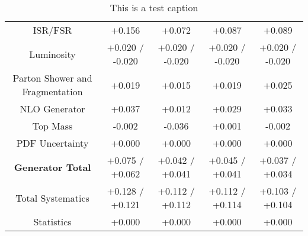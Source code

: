 \begin{table}[htbp]
\begin{center}
\begin{tabular}{|c|c|c|c|c|}
ISR/FSR                               &+0.156              & +0.072              & +0.087              & +0.089             \\
Luminosity                            &+0.020   / -0.020   & +0.020   / -0.020   & +0.020   / -0.020   & +0.020   / -0.020  \\
Parton Shower and Fragmentation       &+0.019              & +0.015              & +0.019              & +0.025             \\
NLO Generator                         &+0.037              & +0.012              & +0.029              & +0.033             \\
Top Mass                              &-0.002              & -0.036              & +0.001              & -0.002             \\
PDF Uncertainty                       &+0.000              & +0.000              & +0.000              & +0.000             \\
\hline
\textbf{Generator Total}              &+0.075   / +0.062   & +0.042   / +0.041   & +0.045   / +0.041   & +0.037   / +0.034  \\
\hline
\hline
Total Systematics                     &+0.128   / +0.121   & +0.112   / +0.112   & +0.112   / +0.114   & +0.103   / +0.104  \\
Statistics                            &+0.000              & +0.000              & +0.000              & +0.000             \\
\hline
  \end{tabular}
  \end{center} 
  \label{tab:xsec_nominal_rratio}
  \caption{This is a test caption}
\end{table}
 

  
\clearpage

